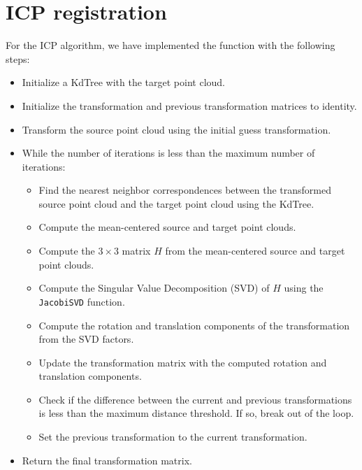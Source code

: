 \section{ICP registration}
For the ICP algorithm, we have implemented the function with the following steps:
\begin{itemize}
    \item Initialize a KdTree with the target point cloud.
    \item Initialize the transformation and previous transformation matrices to identity.
    \item Transform the source point cloud using the initial guess transformation.
    \item While the number of iterations is less than the maximum number of iterations: 
    \begin{itemize}
        \item Find the nearest neighbor correspondences between the transformed source point cloud and the target point cloud using the KdTree. 
        \item Compute the mean-centered source and target point clouds. 
        \item Compute the $3 \times 3$ matrix $H$ from the mean-centered source and target point clouds. 
        \item Compute the Singular Value Decomposition (SVD) of $H$ using the \texttt{JacobiSVD} function. 
        \item Compute the rotation and translation components of the transformation from the SVD factors. 
        \item Update the transformation matrix with the computed rotation and translation components. 
        \item Check if the difference between the current and previous transformations is less than the maximum distance threshold. If so, break out of the loop. 
        \item Set the previous transformation to the current transformation.
    \end{itemize}
    \item Return the final transformation matrix.
\end{itemize}